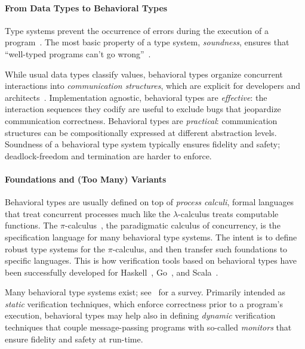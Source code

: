\documentclass[sigplan,10pt]{acmart}\settopmatter{printfolios=false,printccs=false,printacmref=false}
\begin{document}
\paragraph{From Data Types to Behavioral Types}
Type systems prevent the occurrence of  errors during the execution of a program~\cite{DBLP:books/crc/tucker97/Cardelli97}.
The most basic property of a type system, \emph{soundness}, ensures that ``well-typed programs can't go wrong''~\cite{DBLP:journals/jcss/Milner78}.

While usual data types classify values, {behavioral types}
 organize concurrent interactions into   \emph{communication structures}, which are explicit for developers and architects~\cite{DBLP:journals/eatcs/Vasconcelos11}. Implementation agnostic, behavioral types are \emph{effective}: the interaction sequences they codify are useful to exclude bugs that jeopardize communication correctness. Behavioral types are \emph{practical}:  communication structures can be compositionally expressed at different abstraction levels.
 Soundness of a behavioral type system typically ensures fidelity and safety; deadlock-freedom and termination are harder to enforce.
 
\paragraph{Foundations and (Too Many) Variants}
Behavioral types are usually defined on top of \emph{process calculi}, formal languages that treat concurrent processes much like the $\lambda$-calculus treats computable functions. The $\pi$-calculus~\cite{MilnerPW92a}, the paradigmatic calculus of concurrency, is the specification language for many   behavioral type systems. The intent is to define robust type systems for the $\pi$-calculus, and then transfer such foundations to specific languages. 
This is how verification tools based on behavioral types 
have been successfully developed
for 
Haskell~\cite{DBLP:conf/popl/OrchardY16}, Go~\cite{DBLP:conf/cc/NgY16,DBLP:conf/popl/LangeNTY17}, and Scala~\cite{DBLP:conf/ecoop/ScalasDHY17}.

Many behavioral type systems exist; see~\cite{DBLP:journals/csur/HuttelLVCCDMPRT16} for a survey. 
Primarily intended as \emph{static} verification techniques, which enforce correctness prior to a program's execution, behavioral types may help also in defining \emph{dynamic}  verification techniques that    
{couple} %
message-passing programs with so-called \emph{monitors} that ensure fidelity and safety at run-time.
\end{document}
